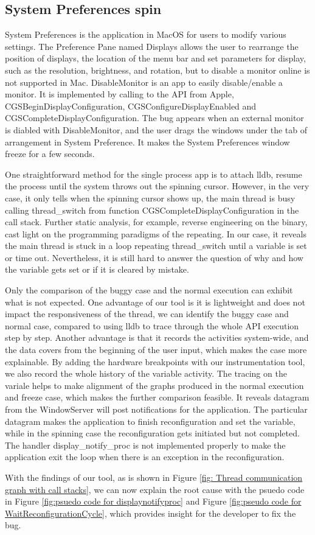 \subsection{System Preferences spin}
System Preferences is the application in MacOS for users to modify various settings.
The Preference Pane named Displays allows the user to rearrange the position of displays,
the location of the menu bar and set parameters for display, such as the resolution, brightness, and rotation,
but to disable a monitor online is not supported in Mac.
DisableMonitor is an app to easily disable/enable a monitor.
It is implemented by calling to the API from Apple, CGSBeginDisplayConfiguration, CGSConfigureDisplayEnabled and CGSCompleteDisplayConfiguration.
The bug appears when an external monitor is diabled with DisableMonitor, and the user drags the windows under the tab of arrangement in System Preference.
It makes the System Preferences window freeze for a few seconds.\par
One straightforward method for the single process app is to attach lldb, resume the process until the system throws out the spinning cursor.
However, in the very case, it only tells when the spinning cursor shows up, the main thread is busy calling thread\_switch from function CGSCompleteDisplayConfiguration in the call stack.
Further static analysis, for example, reverse engineering on the binary, cast light on the programming paradigms of the repeating.
In our case, it reveals the main thread is stuck in a loop repeating thread\_switch until a variable is set or time out.
Nevertheless, it is still hard to answer the question of why and how the variable gets set or if it is cleared by mistake.
\par
Only the comparison of the buggy case and the normal execution can exhibit what is not expected.
One advantage of our tool is it is lightweight and does not impact the responsiveness of the thread,
we can identify the buggy case and normal case,
compared to using lldb to trace through the whole API execution step by step.
Another advantage is that it records the activities system-wide,
and the data covers from the beginning of the user input, which makes the case more explainable.
By adding the hardware breakpoints with our instrumentation tool,
we also record the whole history of the variable activity.
The tracing on the variale helps to make alignment of the graphs produced in the normal execution and freeze case, which makes the further comparison feasible.
It reveals datagram from the WindowServer will post notifications for the application.
The particular datagram makes the application to finish reconfiguration and set the variable, while in the spinning case the reconfiguration gets initiated but not completed.
The handler display\_notify\_proc is not implemented properly to make the application exit the loop when there is an exception in the reconfiguration.\par
With the findings of our tool, as is shown in Figure \ref{fig: Thread communication graph with call stacks},
we can now explain the root cause with the psuedo code in Figure \ref{fig:psuedo code for displaynotifyproc} and Figure \ref{fig:pseudo code for WaitReconfigurationCycle},
which provides insight for the developer to fix the bug.
